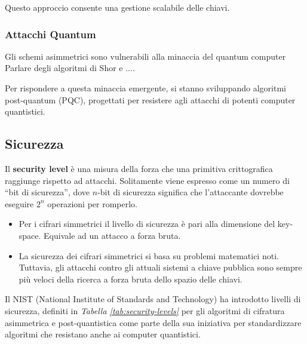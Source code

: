 \noindent
Questo approccio consente una gestione scalabile delle chiavi.

\subsubsection*{Attacchi Quantum}

Gli schemi asimmetrici sono vulnerabili alla minaccia del quantum computer
Parlare degli algoritmi di Shor e ....

Per rispondere a questa minaccia emergente, si stanno sviluppando algoritmi
post-quantum (PQC), progettati per resistere agli attacchi di potenti computer
quantistici.


\subsection{Sicurezza}


Il \textbf{security level} è una misura della forza che una primitiva crittografica raggiunge rispetto ad attacchi.
Solitamente viene espresso come un numero di “bit di sicurezza”, dove $n$-bit di sicurezza significa che l'attaccante dovrebbe eseguire $2^n$ operazioni per romperlo.
\begin{itemize}
    \item Per i cifrari simmetrici il livello di sicurezza è pari alla dimensione del key-space. Equivale ad un attacco a forza bruta.
    \item La sicurezza dei cifrari simmetrici si basa su problemi matematici noti. Tuttavia, gli attacchi contro gli attuali sistemi a chiave pubblica sono sempre più veloci della ricerca a forza bruta dello spazio delle chiavi.
\end{itemize}

\noindent
Il NIST (National Institute of Standards and Technology) ha introdotto livelli di sicurezza, definiti in \textit{Tabella \ref{tab:security-levels}} per gli algoritmi di cifratura asimmetrica e post-quantistica come parte della sua iniziativa per standardizzare algoritmi che resistano anche ai computer quantistici.

